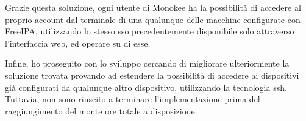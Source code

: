 Grazie questa soluzione, ogni utente di Monokee ha la possibilità di accedere al proprio account dal terminale di una qualunque delle macchine configurate con FreeIPA, utilizzando lo stesso \acrshort{sso} precedentemente disponibile solo attraverso l'interfaccia web, ed operare su di esse.

Infine, ho proseguito con lo sviluppo cercando di migliorare ulteriormente la soluzione trovata provando ad estendere la possibilità di accedere ai dispositivi già configurati da qualunque altro dispositivo, utilizzando la tecnologia \acrfull{ssh}. Tuttavia, non sono riuscito a terminare l'implementazione prima del raggiungimento del monte ore totale a disposizione. 




    
    

    
    
